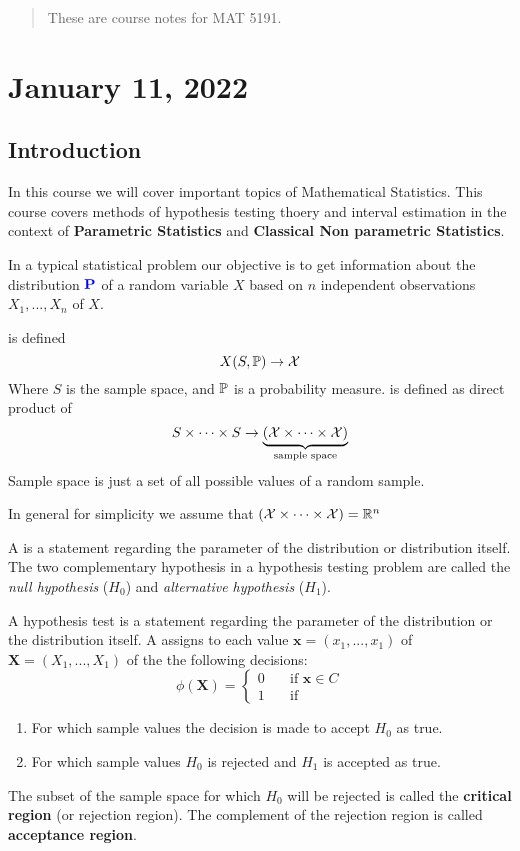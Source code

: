 \begin{abstract}
    These are course notes for MAT 5191.
\end{abstract}

\section{January 11, 2022}
\subsection{Introduction}
In this course we will cover important topics of Mathematical Statistics. This course covers methods of hypothesis testing thoery and interval estimation in the context of \textbf{Parametric Statistics} and \textbf{Classical Non parametric Statistics}.

In a typical statistical problem our objective is to get information about the distribution $\textbf{\color{blue} P}$ of a random variable $X$ based on $n$ independent observations $X_1,...,X_n$ of $X$. 

\begin{definition}
 is defined 
$$
X(S,\mathbb P) \to \mathcal X
$$
Where $S$ is the sample space, and $\mathbb P$ is a probability measure.
 is defined as direct product of 
$$
S \times \cdots \times S \to \underbrace{(\mathcal X \times \cdots \times \mathcal X)}_\text{sample space}
$$
Sample space is just a set of all possible values of a random sample.
\end{definition}
In general for simplicity we assume that $(\mathcal X \times \cdots \times \mathcal X) = \mathbb R^n$

A  is a statement regarding the parameter of the distribution or distribution itself. The two complementary hypothesis in a hypothesis testing problem are called the \textit{null hypothesis} ($H_0$) and \textit{alternative hypothesis} ($H_1$).
\begin{definition}
    A hypothesis test is a statement regarding the parameter of the distribution or the distribution itself. A  assigns to each value $\boldsymbol{x} = (x_1,...,x_1)$ of $\boldsymbol{X} = (X_1,...,X_1)$ of the the following decisions:
    \begin{equation}
    \phi(\boldsymbol{X}) = 
    \begin{cases}
     0 \quad& \text{if }  \boldsymbol{x} \in C \\
    1 & \text{if} 
    \end{cases}
    \end{equation}
    
    \begin{enumerate}[i]
        \item For which sample values the decision is made to accept $H_0$ as true.
        \item For which sample values $H_0$ is rejected and $H_1$ is accepted as true. 
    \end{enumerate}
\end{definition}
The subset of the sample space for which $H_0$ will be rejected is called the \textbf{critical region} (or rejection region). The complement of the rejection region is called \textbf{acceptance region}.

